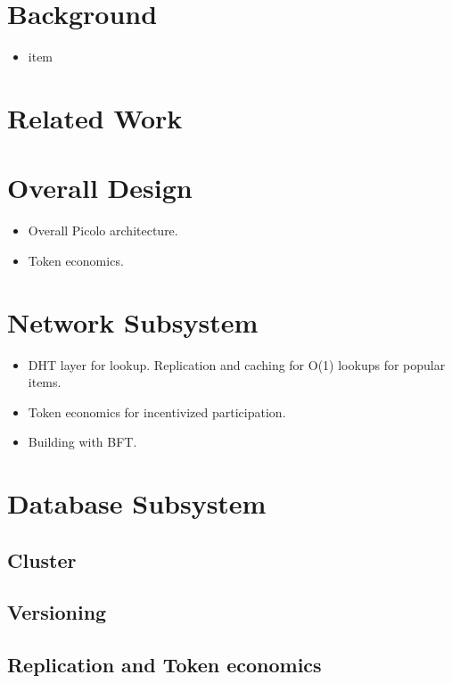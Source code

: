 \documentclass[preprint,12pt]{elsarticle}
\begin{document}
\section{Background}
    \begin{itemize}
        \item item
    \end{itemize}

\section{Related Work}
\section{Overall Design}

    \begin{itemize}
        \item Overall Picolo architecture.
        \item Token economics.
    \end{itemize}
\section{Network Subsystem}

    \begin{itemize}
        \item DHT layer for lookup. Replication and caching for O(1) lookups for popular items.
        \item Token economics for incentivized participation.
        \item Building with BFT.
    \end{itemize}
\section{Database Subsystem}

\subsection{Cluster}
\subsection{Versioning}
\subsection{Replication and Token economics}
\end{document}
